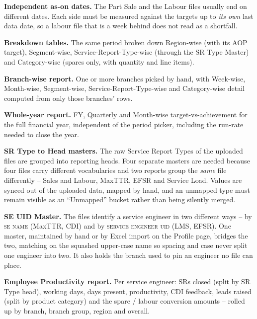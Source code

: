 \documentclass[11pt,a4paper]{article}
\newcommand{\qt}[1]{\textquotedblleft #1\textquotedblright}
\newcommand{\col}[1]{\textsc{\small #1}}
\begin{document}
\begin{reqlist}
\item \textbf{Independent as-on dates.} The Part Sale and the Labour files usually end on
different dates. Each side must be measured against the targets up to \emph{its own} last
data date, so a labour file that is a week behind does not read as a shortfall.

\item \textbf{Breakdown tables.} The same period broken down Region-wise (with its AOP
target), Segment-wise, Service-Report-Type-wise (through the SR Type Master) and
Category-wise (spares only, with quantity and line items).

\item \textbf{Branch-wise report.} One or more branches picked by hand, with Week-wise,
Month-wise, Segment-wise, Service-Report-Type-wise and Category-wise detail computed from
only those branches' rows.

\item \textbf{Whole-year report.} FY, Quarterly and Month-wise target-vs-achievement for
the full financial year, independent of the period picker, including the run-rate needed
to close the year.

\item \textbf{SR Type to Head masters.} The raw Service Report Types of the uploaded files
are grouped into reporting heads. Four separate masters are needed because four files
carry different vocabularies and two reports group the \emph{same} file differently --
Sales and Labour, MaxTTR, EFSR and Service Load. Values are synced out of the uploaded
data, mapped by hand, and an unmapped type must remain visible as an \qt{Unmapped} bucket
rather than being silently merged.

\item \textbf{SE UID Master.} The files identify a service engineer in two different ways
-- by \col{se name} (MaxTTR, CDI) and by \col{service engineer uid} (LMS, EFSR). One
master, maintained by hand or by Excel import on the Profile page, bridges the two,
matching on the squashed upper-case name so spacing and case never split one engineer into
two. It also holds the branch used to pin an engineer no file can place.

\item \textbf{Employee Productivity report.} Per service engineer: SRs closed (split by SR
Type head), working days, days present, productivity, CDI feedback, leads raised (split by
product category) and the spare / labour conversion amounts -- rolled up by branch, branch
group, region and overall.


\end{reqlist}
\end{document}

